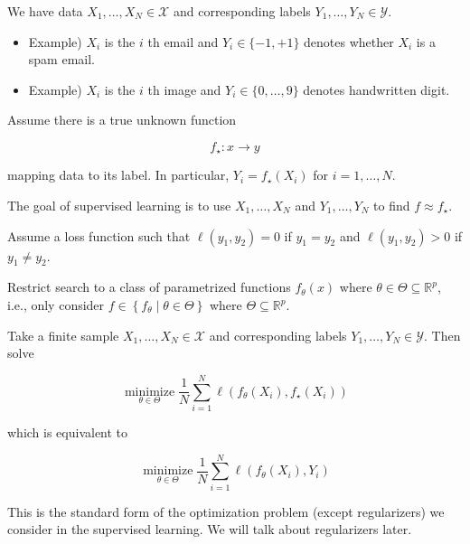 \documentclass{report}
\begin{document}
\begin{definition}
    We have data $X_{1}, \ldots, X_{N} \in \mathcal{X}$ and corresponding labels $Y_{1}, \ldots, Y_{N} \in \mathcal{Y}$.

    \begin{itemize}
        \item Example) $X_{i}$ is the $i$ th email and $Y_{i} \in\{-1,+1\}$ denotes whether $X_{i}$ is a spam email.
        \item Example) $X_{i}$ is the $i$ th image and $Y_{i} \in\{0, \ldots, 9\}$ denotes handwritten digit.
    \end{itemize}

    Assume there is a true unknown function

    $$
    f_{\star}: x \rightarrow y
    $$

    mapping data to its label. In particular, $Y_{i}=f_{\star}\left(X_{i}\right)$ for $i=1, \ldots, N$.

    The goal of supervised learning is to use $X_{1}, \ldots, X_{N}$ and $Y_{1}, \ldots, Y_{N}$ to find $f \approx f_{\star}$.
\end{definition}

\begin{definition}
    Assume a loss function such that $\ell\left(y_{1}, y_{2}\right)=0$ if $y_{1}=y_{2}$ and $\ell\left(y_{1}, y_{2}\right)>0$ if $y_{1} \neq y_{2}$.

    Restrict search to a class of parametrized functions $f_{\theta}(x)$ where $\theta \in \Theta \subseteq \mathbb{R}^{p}$, i.e., only consider $f \in\left\{f_{\theta} \mid \theta \in \Theta\right\}$ where $\Theta \subseteq \mathbb{R}^{p}$.

    Take a finite sample $X_{1}, \ldots, X_{N} \in \mathcal{X}$ and corresponding labels $Y_{1}, \ldots, Y_{N} \in \mathcal{Y}$. Then solve

    $$
    \underset{\theta \in \Theta}{\operatorname{minimize}} \frac{1}{N} \sum_{i=1}^{N} \ell\left(f_{\theta}\left(X_{i}\right), f_{\star}\left(X_{i}\right)\right)
    $$

    which is equivalent to

    $$
    \underset{\theta \in \Theta}{\operatorname{minimize}} \frac{1}{N} \sum_{i=1}^{N} \ell\left(f_{\theta}\left(X_{i}\right), Y_{i}\right)
    $$

    This is the standard form of the optimization problem (except regularizers) we consider in the supervised learning. We will talk about regularizers later.
\end{definition}
\end{document}
